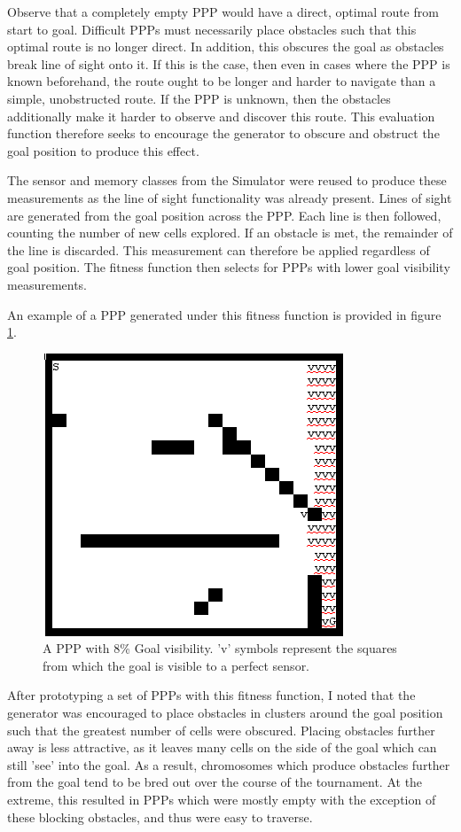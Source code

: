 \documentclass[authoryearcitations]{UoYCSproject}
\begin{document}
Observe that a completely empty PPP would have a direct, optimal route from start to goal. Difficult PPPs must necessarily place obstacles such that this optimal route is no longer direct. In addition, this obscures the goal as obstacles break line of sight onto it. If this is the case, then even in cases where the PPP is known beforehand, the route ought to be longer and harder to navigate than a simple, unobstructed route. If the PPP is unknown, then the obstacles additionally make it harder to observe and discover this route. This evaluation function therefore seeks to encourage the generator to obscure and obstruct the goal position to produce this effect.

The sensor and memory classes from the Simulator were reused to produce these measurements as the line of sight functionality was already present. Lines of sight are generated from the goal position across the PPP. Each line is then followed, counting the number of new cells explored. If an obstacle is met, the remainder of the line is discarded. This measurement can therefore be applied regardless of goal position. The fitness function then selects for PPPs with lower goal visibility measurements.

An example of a PPP generated under this fitness function is provided in figure \ref{fig:goal_vis_ppp}.

\begin{figure}
\graphicspath{ {DesignImpPics/} }
\includegraphics[scale=0.65]{visFromGoal.png}
\caption{A PPP with 8\% Goal visibility. 'v' symbols represent the squares from which the goal is visible to a perfect sensor.}
\label{fig:goal_vis_ppp}
\end{figure}

After prototyping a set of PPPs with this fitness function, I noted that the generator was encouraged to place obstacles in clusters around the goal position such that the greatest number of cells were obscured. Placing obstacles further away is less attractive, as it leaves many cells on the side of the goal which can still 'see' into the goal. As a result, chromosomes which produce obstacles further from the goal tend to be bred out over the course of the tournament. At the extreme, this resulted in PPPs which were mostly empty with the exception of these blocking obstacles, and thus were easy to traverse.
\end{document}
